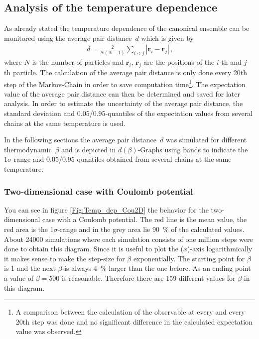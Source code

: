 \documentclass[11pt, a4paper]{article}
\numberwithin{equation}{section}
\newcommand{\remark}[1]{{\color{red}(#1)}}
\begin{document}
\subsection{Analysis of the temperature dependence} \label{sec:Temp_Dep}
As already stated the temperature dependence of the canonical ensemble can be monitored using the average pair distance~$d$ which is given by
\begin{align*}
d = \frac{2}{N(N - 1)} \sum_{i<j} |\mathbf{r}_i - \mathbf{r}_j | \, \text{,}
\end{align*}
where $N$ is the number of particles and $\mathbf{r}_i$, $\mathbf{r}_j$ are the positions of the $i$-th and $j$-th particle.
The calculation of the average pair distance is only done every 20th step of the Markov-Chain in order to save computation time\footnote{A comparison between the calculation of the observable at every and every 20th step was done and no significant difference in the calculated expectation value was observed.}.
The expectation value of the average pair distance can then be determined and saved for later analysis.
In order to estimate the uncertainty of the average pair distance, the standard deviation and 0.05/0.95-quantiles of the expectation values from several chains at the same temperature is used.

In the following sections the average pair distance~$d$ was simulated for different thermodynamic~$\beta$ and is depicted in $d(\beta)$-Graphs using bands to indicate the $1\sigma$-range and 0.05/0.95-quantiles obtained from several chains at the same temperature.

\subsubsection{Two-dimensional case with Coulomb potential} \label{sec:2d_coulomb_tempdep}
You can see in figure \ref{Fig:Temp_dep_Cou2D} the behavior for the two-dimensional case with a Coulomb potential.
The red line is the mean value, the red area is the 1$\sigma$-range and in the grey area lie \SI{90}{\percent} of the calculated values.
About 24000 simulations where each simulation consists of one million steps were done to obtain this diagram.
Since it is useful to plot the \remark{$x$}-axis logarithmically it makes sense to make the step-size for $\beta$ exponentially.
The starting point for $\beta$ is 1 and the next $\beta$ is always \SI{4}{\percent} larger than the one before.
As an ending point a value of $\beta=500$ is reasonable.
Therefore there are 159 different values for $\beta$ in this diagram.
\end{document}
